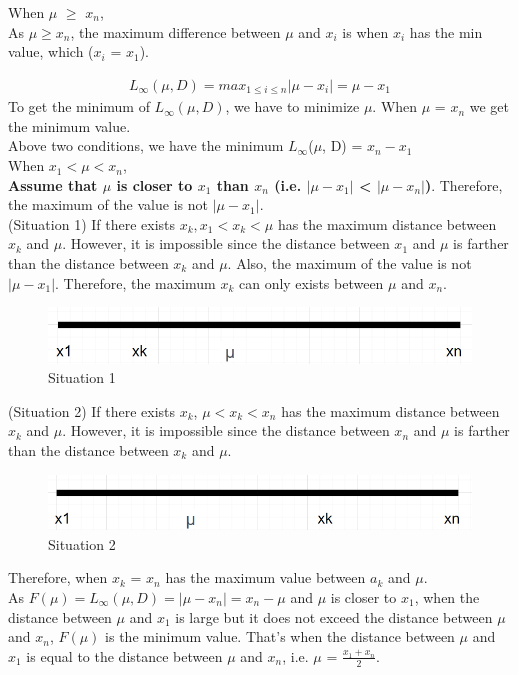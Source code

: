 \documentclass{article}
\begin{document}
When $\mu$ $\geq$ $x_n$,\\
As $\mu \geq x_n$, the maximum difference between $\mu$ and $x_i$ is when $x_i$ has the min value, which ($x_i$ = $x_1$).

\begin{gather}
L_{\infty} (\mu,D) = max_{1 \leq i \leq n} |\mu - x_i| = \mu - x_1
\end{gather}
To get the minimum of $L_{\infty} (\mu,D)$, we have to minimize $\mu$. When $\mu$ = $x_n$ we get the minimum value.\\
Above two conditions, we have the minimum $L_{\infty}$($\mu$, D)  = $x_n - x_1$\\

When $x_1 < \mu < x_n$,\\
\textbf{Assume that $\mu$ is closer to $x_1$ than $x_n$ (i.e. $|\mu - x_1|$ < $|\mu - x_n|$)}. Therefore, the maximum of the value is not $|\mu - x_1|$. \\(Situation 1) If there exists $x_k, x_1 < x_k < \mu$ has the maximum distance between $x_k$ and $\mu$. However, it is impossible since the distance between $x_1$ and $\mu$ is farther than the distance between $x_k$ and $\mu$. Also, the maximum of the value is not $|\mu - x_1|$. Therefore, the maximum $x_k$ can only exists between $\mu$ and $x_n$. \\
\begin{figure}[H]
\centering
\includegraphics[width = \linewidth]{1.png}
\caption{Situation 1}
\end{figure}
(Situation 2) If there exists $x_k$, $\mu < x_k < x_n$ has the maximum distance between $x_k$ and $\mu$. However, it is impossible since the distance between $x_n$ and $\mu$ is farther than the distance between $x_k$ and $\mu$.
\begin{figure}[H]
\centering
\includegraphics[width = \linewidth]{2.png}
\caption{Situation 2}
\end{figure}


Therefore, when $x_k$ = $x_n$ has the maximum value between $a_k$ and $\mu$. \\
As $F(\mu) = L_{\infty}(\mu,D) = |\mu - x_n| = x_n - \mu$ and $\mu$ is closer to $x_1$, when the distance between $\mu$ and $x_1$ is large but it does not exceed the distance between $\mu$ and $x_n$, $F(\mu)$ is the minimum value. That's when the distance between $\mu$ and $x_1$ is equal to the distance between $\mu$ and $x_n$, i.e. $\mu$ = $\frac{x_1 + x_n}{2}$.\\
\end{document}
